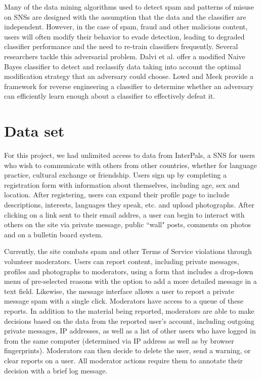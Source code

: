 \documentclass[preprint]{acm_proc_article-sp}
\begin{document}
Many of the data mining algorithms used to detect spam and patterns of misuse on SNSs are designed with the assumption that the data and the classifier are independent. However, in the case of spam, fraud and other malicious content, users will often modify their behavior to evade detection, leading to degraded classifier performance and the need to re-train classifiers frequently. Several researchers tackle this adversarial problem. Dalvi et al. \cite{dalvi} offer a modified Naive Bayes classifier to detect and reclassify data taking into account the optimal modification strategy that an adversary could choose. Lowd and Meek \cite{lowd} provide a framework for reverse engineering a classifier to determine whether an adversary can efficiently learn enough about a classifier to effectively defeat it.


\section{Data set}

For this project, we had unlimited access to data from InterPals, a SNS for users who wish to communicate with others from other countries, whether for language practice, cultural exchange or friendship. Users sign up by completing a registration form with information about themselves, including age, sex and location. After registering, users can expand their profile page to include descriptions, interests, languages they speak, etc. and upload photographs. After clicking on a link sent to their email addres, a user can begin to interact with others on the site via private message, public ``wall" posts, comments on photos and on a bulletin board system.

Currently, the site combats spam and other Terms of Service violations through volunteer moderators. Users can report content, including private messages, profiles and photographs to moderators, using a form that includes a drop-down menu of pre-selected reasons with the option to add a more detailed message in a text field. Likewise, the message interface allows a user to report a private message spam with a single click. Moderators have access to a queue of these reports. In addition to the material being reported, moderators are able to make decisions based on the data from the reported user's account, including outgoing private messages, IP addresses, as well as a list of other users who have logged in from the same computer (determined via IP address as well as by browser fingerprints). Moderators can then decide to delete the user, send a warning, or clear reports on a user. All moderator actions require them to annotate their decision with a brief log message. 
\end{document}
